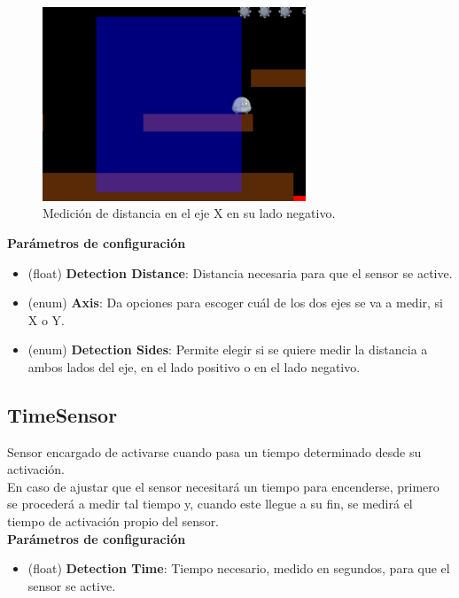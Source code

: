 \begin{itemize}
\begin{figure}[t]
		\centering
		\includegraphics[width = 0.7\textwidth]{Imagenes/SingleAxis_Image.png}
		\caption{Medición de distancia en el eje X en su lado negativo.}
		\label{fig:SingleAxis_Image}
\end{figure}
\textbf{Parámetros de configuración}
	\begin{itemize}
	        \item (float) \textbf{Detection Distance}: Distancia necesaria para que el sensor se active.
	        \item (enum) \textbf{Axis}: Da opciones para escoger cuál de los dos ejes se va a medir, si X o Y.
	        \item (enum) \textbf{Detection Sides}: Permite elegir si se quiere medir la distancia a ambos lados del eje, en el lado positivo o en el lado negativo.
	 \end{itemize}
\end{itemize}

\subsection{TimeSensor}

Sensor encargado de activarse cuando pasa un tiempo determinado desde su activación.\\
En caso de ajustar que el sensor necesitará un tiempo para encenderse, primero se procederá a medir tal tiempo y, cuando este llegue a su fin, se medirá el tiempo de activación propio del sensor.\\

\textbf{Parámetros de configuración}
	\begin{itemize}
	        \item (float) \textbf{Detection Time}: Tiempo necesario, medido en segundos, para que el sensor se active.
	 \end{itemize}

